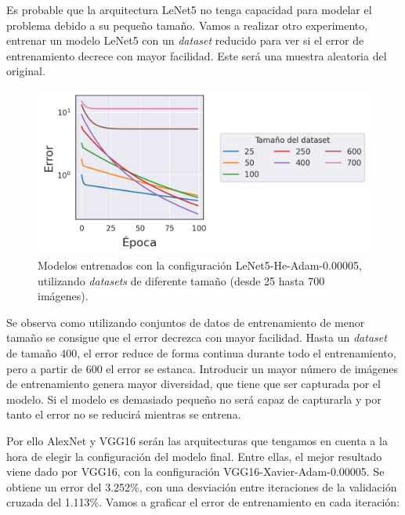 Es probable que la arquitectura LeNet5 no tenga capacidad para modelar el problema debido a su pequeño tamaño. Vamos a realizar otro experimento, entrenar un modelo LeNet5 con un \textit{dataset} reducido para ver si el error de entrenamiento decrece con mayor facilidad. Este será una muestra aleatoria del original.

\begin{figure}[H]
\centering
    \includegraphics[scale=0.64]{imagenes/image_classification/original_dataset/loss_smalldataset.png}
    \caption{Modelos entrenados con la configuración LeNet5-He-Adam-0.00005, utilizando \textit{datasets} de diferente tamaño (desde 25 hasta 700 imágenes).}
\end{figure}

Se observa como utilizando conjuntos de datos de entrenamiento de menor tamaño se consigue que el error decrezca con mayor facilidad. Hasta un \textit{dataset} de tamaño 400, el error reduce de forma continua durante todo el entrenamiento, pero a partir de 600 el error se estanca. Introducir un mayor número de imágenes de entrenamiento genera mayor diversidad, que tiene que ser capturada por el modelo. Si el modelo es demasiado pequeño no será capaz de capturarla y por tanto el error no se reducirá mientras se entrena.

Por ello AlexNet y VGG16 serán las arquitecturas que tengamos en cuenta a la hora de elegir la configuración del modelo final. Entre ellas, el mejor resultado viene dado por VGG16, con la configuración VGG16-Xavier-Adam-0.00005. Se obtiene un error del 3.252\%, con una desviación entre iteraciones de la validación cruzada del 1.113\%. Vamos a graficar el error de entrenamiento en cada iteración:

